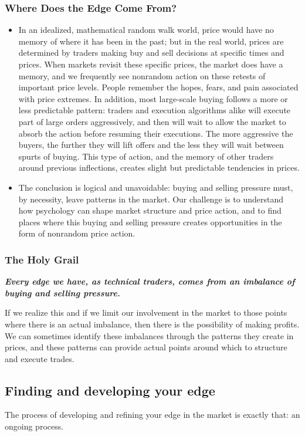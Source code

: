 \documentclass[10pt,twocolumn]{article}
\begin{document}
\subsubsection{Where Does the Edge Come From?}
\begin{itemize}
  \item In an idealized, mathematical random walk world, price would have no memory of where it has been in the past; but in the real world, prices are determined by traders making buy and sell decisions at specific times and prices. When markets revisit these specific prices, the market does have a memory, and we frequently see nonrandom action on these retests of important price levels. People remember the hopes, fears, and pain associated with price extremes. In addition, most large-scale buying follows a more or less predictable pattern: traders and execution algorithms alike will execute part of large orders aggressively, and then will wait to allow the market to absorb the action before resuming their executions. The more aggressive the buyers, the further they will lift offers and the less they will wait between spurts of buying. This type of action, and the memory of other traders around previous inflections, creates slight but predictable tendencies in prices.
  \item The conclusion is logical and unavoidable: buying and selling pressure must, by necessity, leave patterns in the market. Our challenge is to understand how psychology can shape market structure and price action, and to find places where this buying and selling pressure creates opportunities in the form of nonrandom price action.
\end{itemize}

\subsubsection{The Holy Grail}
\textbf{\textit{Every edge we have, as technical traders, comes from an imbalance of buying and selling pressure.}}

If we realize this and if we limit our involvement in the market to those points where there is an actual imbalance, then there is the possibility of making profits. We can sometimes identify these imbalances through the patterns they create in prices, and these patterns can provide actual points around which to structure and execute trades.


\subsection{Finding and developing your edge}
The process of developing and refining your edge in the market is exactly that: an ongoing process.
\end{document}
